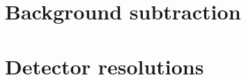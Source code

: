 \section{Background subtraction}\label{sec:bkgdSubtraction}

\section{Detector resolutions}

\begin{figure}[h]
\centering
\parbox{0.4725\textwidth}{
  \centering
  \begin{subfigure}[b]{\linewidth}
                \vspace{50pt}
  \end{subfigure}\\
  \begin{subfigure}[b]{\linewidth}\addtocounter{subfigure}{1}

\end{subfigure}}
\end{figure}
